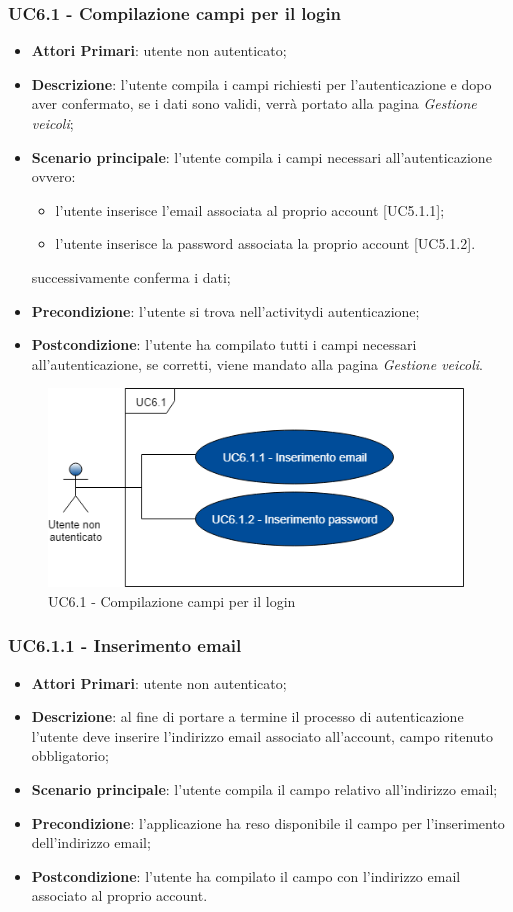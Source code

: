 \subsubsection{UC6.1 - Compilazione campi per il login}
\begin{itemize}
	\item \textbf{Attori Primari}: utente non autenticato;
	\item \textbf{Descrizione}: l'utente compila i campi richiesti per l'autenticazione e dopo aver confermato, se i dati sono validi, verrà portato alla pagina \textit{Gestione veicoli};
	\item \textbf{Scenario principale}: l'utente compila i campi necessari all'autenticazione ovvero:
		\begin{itemize}
			\item l'utente inserisce l'email associata al proprio account [UC5.1.1];
			\item l'utente inserisce la password associata la proprio account [UC5.1.2].
		\end{itemize}
	successivamente conferma i dati;	
	\item \textbf{Precondizione}: l'utente si trova nell'activity\glosp di autenticazione;
	\item \textbf{Postcondizione}: l'utente ha compilato tutti i campi necessari all'autenticazione, se corretti, viene mandato alla pagina \textit{Gestione veicoli}.	
\end{itemize}
\begin{figure}[h]
	\includegraphics[width=11cm]{res/images/UC6-1Compilazione.png}
	\centering
	\caption{UC6.1 - Compilazione campi per il login}
\end{figure}
\subsubsection{UC6.1.1 - Inserimento email}
\begin{itemize}
	\item \textbf{Attori Primari}: utente non autenticato;
	\item \textbf{Descrizione}: al fine di portare a termine il processo di autenticazione l'utente deve inserire l'indirizzo email associato all'account, campo ritenuto obbligatorio;
	\item \textbf{Scenario principale}: l'utente compila il campo relativo all'indirizzo email;	
	\item \textbf{Precondizione}: l'applicazione ha reso disponibile il campo per l'inserimento dell'indirizzo email;
	\item \textbf{Postcondizione}: l'utente ha compilato il campo con l'indirizzo email associato al proprio account.
\end{itemize}

